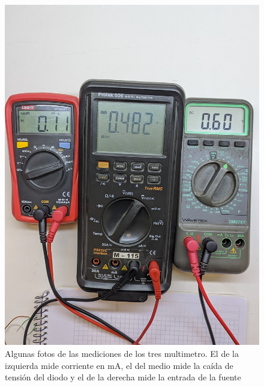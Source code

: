 \documentclass[chaptersright]{informeutn}
\begin{document}
\begin{figure}[!ht]
\begin{minipage}{0.25\textwidth}
          \includegraphics[width=1\textwidth]{pictures/mult_crkt-1_07.jpg}
        \end{minipage}
        \caption{Algunas fotos de las mediciones de los tres multimetro. El de la izquierda mide corriente en mA, el
        del medio mide la caída de tensión del diodo y el de la derecha mide la entrada de la fuente}
      \end{figure}

      \begin{table}[H]
        \caption{Tabla de valores medidos del diodo de silicio.}
        \label{table.Si}
      \end{table}
\end{document}
